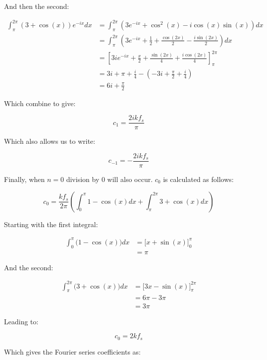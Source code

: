 \begin{appendices}
		\newpage
		And then the second:
		
		\begin{align}
			\int_{\pi}^{2\pi} (3+\cos(x))e^{-ix} dx & = 
				\int_{\pi}^{2\pi} \left( 3e^{-ix} + \cos^{2}(x) - 
				i\cos(x)\sin(x) \right) dx \nonumber \\[0.6em]
			& = \int_{\pi}^{2\pi} \left( 3e^{-ix} + \frac{1}{2} + \frac{\cos(2x)}{2} - 
				\frac{i\sin(2x)}{2} \right) dx \nonumber \\[0.6em]
			& = \left[ 3ie^{-ix} + \frac{x}{2} + \frac{\sin(2x)}{4} + 
				\frac{i\cos(2x)}{4} \right]_{\pi}^{2\pi} \nonumber \\[0.6em]
			& = 3i + \pi + \frac{i}{4} - \left( -3i + \frac{\pi}{2} + \frac{i}{4} \right) \nonumber \\[0.6em]
			& = 6i + \frac{\pi}{2} \nonumber
		\end{align}

		Which combine to give:

		\[ c_{1} = \frac{2ikf_{s}}{\pi} \]

		Which also allows us to write:

		\[ c_{-1} = -\frac{2ikf_{s}}{\pi} \]

		Finally, when $n = 0$ division by 0 will also occur. $c_{0}$ is calculated as follows:

		\[ c_{0} = \frac{kf_{s}}{2\pi} \left( \int_{0}^{\pi} 1-\cos(x) dx
						      + \int_{\pi}^{2\pi} 3 + \cos(x) dx 
						      \right) \]

		Starting with the first integral:

		\begin{align}
			\int_{0}^{\pi} \bigl( 1 - \cos(x) \bigr) dx & = 
				\biggl[ x + \sin(x) \biggr]_{0}^{\pi} \nonumber \\[0.6em]
			& = \pi \nonumber
		\end{align}

		And the second:

		\begin{align}
			\int_{\pi}^{2\pi} \bigl( 3 + \cos(x) \bigr) dx & = 
				\biggl[ 3x - \sin(x) \biggr]_{\pi}^{2\pi} \nonumber \\[0.6em]
			& = 6\pi - 3\pi \nonumber \\[0.6em]
			& = 3\pi \nonumber
		\end{align}

		Leading to:

		\[ c_{0} = 2kf_{s} \]

		Which gives the Fourier series coefficients as:


\end{appendices}
